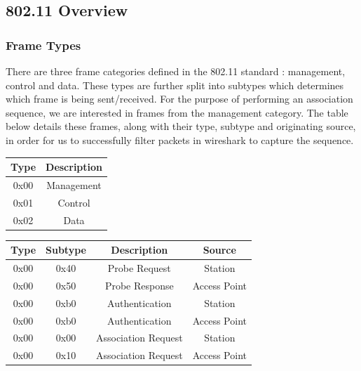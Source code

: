 \subsection{802.11 Overview}
\subsubsection{Frame Types}
There are three frame categories defined in the 802.11 standard \cite{research:80211_standard}: management, control and data. These types are further split into subtypes which determines which frame is being sent/received. For the purpose of performing an association sequence, we are interested in frames from the management category. The table below details these frames, along with their type, subtype and originating source, in order for us to successfully filter packets in wireshark to capture the sequence.

\begin{table}[h!]
\begin{center}
	\begin{tabular}{| c | c |}
		\hline
		\textbf{Type} & \textbf{Description} \\ \hline
		0x00 & Management \\ \hline
		0x01 & Control \\ \hline
		0x02 & Data \\ \hline
	\end{tabular}
	
\end{center}
\end{table}
\begin{table}[h!]
\begin{center}
	\begin{tabular}{| c | c | c | c |}
		\hline
		\textbf{Type} & \textbf{Subtype} &  \textbf{Description} &  \textbf{Source} \\ \hline
		0x00 & 0x40 & Probe Request & Station \\ \hline
		0x00 & 0x50 & Probe Response & Access Point \\ \hline
		0x00 & 0xb0 & Authentication & Station \\ \hline
		0x00 & 0xb0 & Authentication & Access Point \\ \hline
		0x00 & 0x00 & Association Request & Station \\ \hline
		0x00 & 0x10 & Association Request & Access Point \\ \hline
	\end{tabular}
\end{center}
\end{table}

